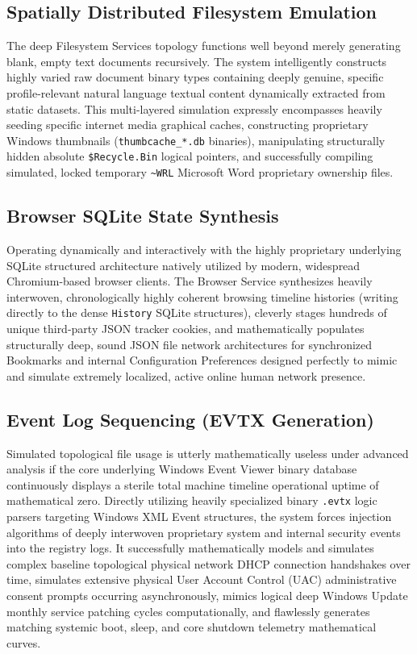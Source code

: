 \documentclass{ieeeaccess}
\begin{document}
\subsection{Spatially Distributed Filesystem Emulation}
The deep Filesystem Services topology functions well beyond merely generating blank, empty text documents recursively. The system intelligently constructs highly varied raw document binary types containing deeply genuine, specific profile-relevant natural language textual content dynamically extracted from static datasets. This multi-layered simulation expressly encompasses heavily seeding specific internet media graphical caches, constructing proprietary Windows thumbnails (\texttt{thumbcache\_*.db} binaries), manipulating structurally hidden absolute \texttt{\$Recycle.Bin} logical pointers, and successfully compiling simulated, locked temporary \texttt{\~{}WRL} Microsoft Word proprietary ownership files.

\subsection{Browser SQLite State Synthesis}
Operating dynamically and interactively with the highly proprietary underlying SQLite structured architecture natively utilized by modern, widespread Chromium-based browser clients. The Browser Service synthesizes heavily interwoven, chronologically highly coherent browsing timeline histories (writing directly to the dense \texttt{History} SQLite structures), cleverly stages hundreds of unique third-party JSON tracker cookies, and mathematically populates structurally deep, sound JSON file network architectures for synchronized Bookmarks and internal Configuration Preferences designed perfectly to mimic and simulate extremely localized, active online human network presence.

\subsection{Event Log Sequencing (EVTX Generation)}
Simulated topological file usage is utterly mathematically useless under advanced analysis if the core underlying Windows Event Viewer binary database continuously displays a sterile total machine timeline operational uptime of mathematical zero. Directly utilizing heavily specialized binary \texttt{.evtx} logic parsers targeting Windows XML Event structures, the system forces injection algorithms of deeply interwoven proprietary system and internal security events into the registry logs. It successfully mathematically models and simulates complex baseline topological physical network DHCP connection handshakes over time, simulates extensive physical User Account Control (UAC) administrative consent prompts occurring asynchronously, mimics logical deep Windows Update monthly service patching cycles computationally, and flawlessly generates matching systemic boot, sleep, and core shutdown telemetry mathematical curves.
\end{document}
